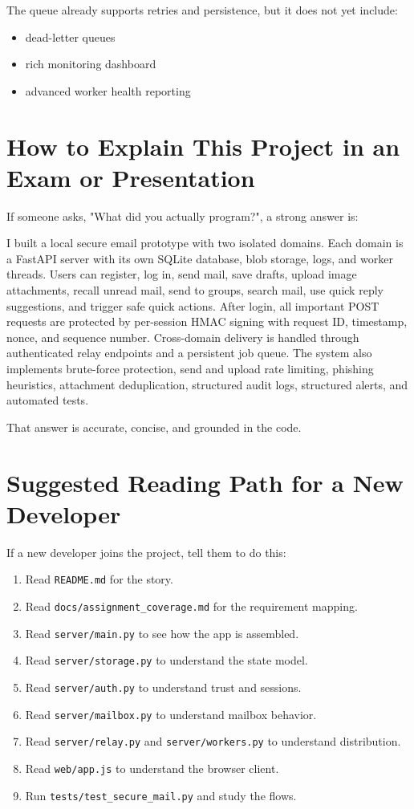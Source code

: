 \documentclass[11pt,a4paper]{article}
\begin{document}
The queue already supports retries and persistence, but it does not yet include:

\begin{itemize}
\item dead-letter queues
\item rich monitoring dashboard
\item advanced worker health reporting
\end{itemize}


\section{How to Explain This Project in an Exam or Presentation}

If someone asks, "What did you actually program?", a strong answer is:

I built a local secure email prototype with two isolated domains. Each domain is a FastAPI server with its own SQLite database, blob storage, logs, and worker threads. Users can register, log in, send mail, save drafts, upload image attachments, recall unread mail, send to groups, search mail, use quick reply suggestions, and trigger safe quick actions. After login, all important POST requests are protected by per-session HMAC signing with request ID, timestamp, nonce, and sequence number. Cross-domain delivery is handled through authenticated relay endpoints and a persistent job queue. The system also implements brute-force protection, send and upload rate limiting, phishing heuristics, attachment deduplication, structured audit logs, structured alerts, and automated tests.

That answer is accurate, concise, and grounded in the code.


\section{Suggested Reading Path for a New Developer}

If a new developer joins the project, tell them to do this:

\begin{enumerate}
\item Read \nolinkurl{README.md} for the story.
\item Read \nolinkurl{docs/assignment_coverage.md} for the requirement mapping.
\item Read \nolinkurl{server/main.py} to see how the app is assembled.
\item Read \nolinkurl{server/storage.py} to understand the state model.
\item Read \nolinkurl{server/auth.py} to understand trust and sessions.
\item Read \nolinkurl{server/mailbox.py} to understand mailbox behavior.
\item Read \nolinkurl{server/relay.py} and \nolinkurl{server/workers.py} to understand distribution.
\item Read \nolinkurl{web/app.js} to understand the browser client.
\item Run \nolinkurl{tests/test_secure_mail.py} and study the flows.
\end{enumerate}
\end{document}
